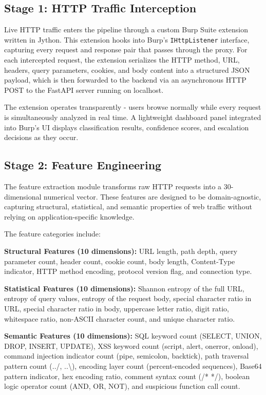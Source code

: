 \documentclass[journal,onecolumn]{IEEEtran}
\begin{document}
\subsection{Stage 1: HTTP Traffic Interception}
Live HTTP traffic enters the pipeline through a custom Burp Suite extension written in Jython. This extension hooks into Burp's \texttt{IHttpListener} interface, capturing every request and response pair that passes through the proxy. For each intercepted request, the extension serializes the HTTP method, URL, headers, query parameters, cookies, and body content into a structured JSON payload, which is then forwarded to the backend via an asynchronous HTTP POST to the FastAPI server running on localhost.

The extension operates transparently - users browse normally while every request is simultaneously analyzed in real time. A lightweight dashboard panel integrated into Burp's UI displays classification results, confidence scores, and escalation decisions as they occur.

\subsection{Stage 2: Feature Engineering}
The feature extraction module transforms raw HTTP requests into a 30-dimensional numerical vector. These features are designed to be domain-agnostic, capturing structural, statistical, and semantic properties of web traffic without relying on application-specific knowledge.

The feature categories include:

\textbf{Structural Features (10 dimensions):} URL length, path depth, query parameter count, header count, cookie count, body length, Content-Type indicator, HTTP method encoding, protocol version flag, and connection type.

\textbf{Statistical Features (10 dimensions):} Shannon entropy of the full URL, entropy of query values, entropy of the request body, special character ratio in URL, special character ratio in body, uppercase letter ratio, digit ratio, whitespace ratio, non-ASCII character count, and unique character ratio.

\textbf{Semantic Features (10 dimensions):} SQL keyword count (SELECT, UNION, DROP, INSERT, UPDATE), XSS keyword count (script, alert, onerror, onload), command injection indicator count (pipe, semicolon, backtick), path traversal pattern count (../, ..\textbackslash), encoding layer count (percent-encoded sequences), Base64 pattern indicator, hex encoding ratio, comment syntax count (/* */), boolean logic operator count (AND, OR, NOT), and suspicious function call count.
\end{document}
